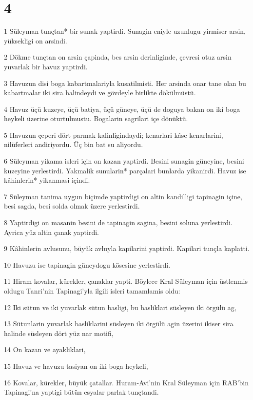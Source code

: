 \chapter{4}

\par 1 Süleyman tunçtan* bir sunak yaptirdi. Sunagin eniyle uzunlugu yirmiser arsin, yüksekligi on arsindi.
\par 2 Dökme tunçtan on arsin çapinda, bes arsin derinliginde, çevresi otuz arsin yuvarlak bir havuz yaptirdi.
\par 3 Havuzun disi boga kabartmalariyla kusatilmisti. Her arsinda onar tane olan bu kabartmalar iki sira halindeydi ve gövdeyle birlikte dökülmüstü.
\par 4 Havuz üçü kuzeye, üçü batiya, üçü güneye, üçü de doguya bakan on iki boga heykeli üzerine oturtulmustu. Bogalarin sagrilari içe dönüktü.
\par 5 Havuzun çeperi dört parmak kalinligindaydi; kenarlari kâse kenarlarini, nilüferleri andiriyordu. Üç bin bat su aliyordu.
\par 6 Süleyman yikama isleri için on kazan yaptirdi. Besini sunagin güneyine, besini kuzeyine yerlestirdi. Yakmalik sunularin* parçalari bunlarda yikanirdi. Havuz ise kâhinlerin* yikanmasi içindi.
\par 7 Süleyman tanima uygun biçimde yaptirdigi on altin kandilligi tapinagin içine, besi sagda, besi solda olmak üzere yerlestirdi.
\par 8 Yaptirdigi on masanin besini de tapinagin sagina, besini soluna yerlestirdi. Ayrica yüz altin çanak yaptirdi.
\par 9 Kâhinlerin avlusunu, büyük avluyla kapilarini yaptirdi. Kapilari tunçla kaplatti.
\par 10 Havuzu ise tapinagin güneydogu kösesine yerlestirdi.
\par 11 Hiram kovalar, kürekler, çanaklar yapti. Böylece Kral Süleyman için üstlenmis oldugu Tanri'nin Tapinagi'yla ilgili isleri tamamlamis oldu:
\par 12 Iki sütun ve iki yuvarlak sütun basligi, bu basliklari süsleyen iki örgülü ag,
\par 13 Sütunlarin yuvarlak basliklarini süsleyen iki örgülü agin üzerini ikiser sira halinde süsleyen dört yüz nar motifi,
\par 14 On kazan ve ayakliklari,
\par 15 Havuz ve havuzu tasiyan on iki boga heykeli,
\par 16 Kovalar, kürekler, büyük çatallar. Huram-Avi'nin Kral Süleyman için RAB'bin Tapinagi'na yaptigi bütün esyalar parlak tunçtandi.
